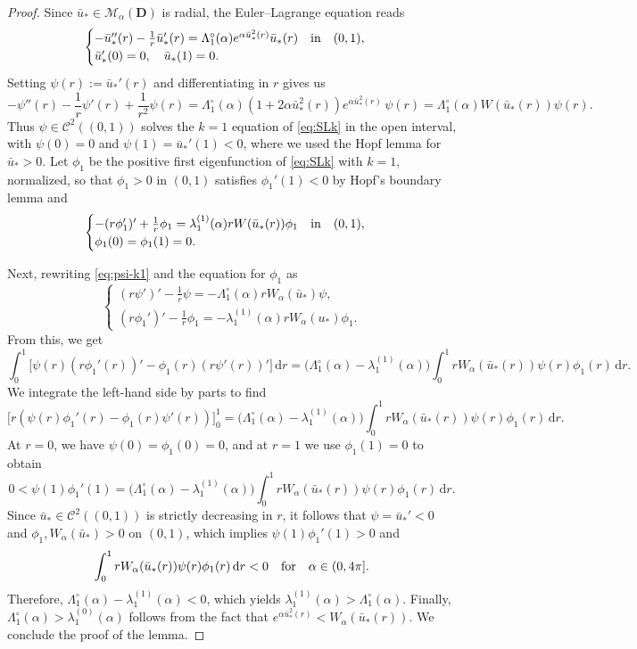 \documentclass[reqno,11pt]{amsart}
\theoremstyle{definition}
\newcommand{\ud}{\,\mathrm{d}}
\begin{document}
\begin{proof}
Since $\bar{u}_*\in\mathcal{M}_\alpha(\mathbf{D})$ is radial, the Euler--Lagrange equation reads
\[
\begin{cases}
-\bar{u}_*''(r)-\frac1r \bar{u}_*'(r)=\Lambda_1^\circ(\alpha)e^{\alpha \bar{u}_*^2(r)}\bar{u}_*(r) \quad {\rm in} \quad (0,1),\\
\bar{u}_*'(0)=0,\quad \bar{u}_*(1)=0.  
\end{cases}
\]
Setting $\psi(r):=\bar{u}_*'(r)$ and differentiating in $r$ gives us
\begin{equation}\label{eq:psi-k1}
-\psi''(r)-\frac1r\psi'(r)+\frac{1}{r^2}\psi(r)
=\Lambda_1^\circ(\alpha)(1+2\alpha \bar{u}_*^2(r))e^{\alpha \bar{u}_*^2(r)}\,\psi(r)
=\Lambda_1^\circ(\alpha)W(\bar{u}_*(r))\psi(r).
\end{equation}
Thus $\psi\in \mathcal{C}^2((0,1))$ solves the $k=1$ equation of \eqref{eq:SLk} in the open interval, with
$\psi(0)=0$ and $\psi(1)=\bar{u}_*'(1)<0$, where we used the Hopf lemma for $\bar{u}_*>0$.
Let $\phi_1$ be the positive first eigenfunction of \eqref{eq:SLk} with $k=1$,
normalized, so that $\phi_1>0$ in $(0,1)$ satisfies $\phi_1'(1)<0$ by Hopf’s boundary lemma and
\[
\begin{cases}
-(r\phi_1')'+\frac{1}{r}\phi_1=\lambda_1^{(1)}(\alpha)rW(\bar{u}_*(r))\phi_1 \quad {\rm in} \quad (0,1),\\
\phi_1(0)=\phi_1(1)=0. 
\end{cases}
\]

Next, rewriting \eqref{eq:psi-k1} and the equation for $\phi_1$ as
\[
\begin{cases}
(r\psi')'-\frac{1}{r}\psi=-\Lambda_1^\circ(\alpha)r W_\alpha(\bar{u}_*) \psi,\\
(r\phi_1')'-\frac{1}{r}\phi_1=-\lambda_1^{(1)}(\alpha)r W_\alpha(u_*)\phi_1.
\end{cases}
\]
From this, we get
\[
\int_0^1\big[\psi(r)(r\phi_1'(r))'-\phi_1(r)(r\psi'(r))'\big]\ud r
=\big(\Lambda_1^\circ(\alpha)-\lambda_1^{(1)}(\alpha)\big)\int_0^1 r W_\alpha(\bar{u}_*(r)) \psi(r)\phi_1(r)\ud r.
\]
We integrate the left-hand side by parts to find
\[
\big[r(\psi(r)\phi_1'(r)-\phi_1(r)\psi'(r))\big]_{0}^{1}
=\big(\Lambda_1^\circ(\alpha)-\lambda_1^{(1)}(\alpha)\big)\int_0^1 rW_\alpha(\bar{u}_*(r))\psi(r)\phi_1(r)\ud r.
\]
At $r=0$, we have $\psi(0)=\phi_1(0)=0$, and at $r=1$ we use $\phi_1(1)=0$ to obtain
\[
0<\psi(1)\phi_1'(1)=
\big(\Lambda_1^\circ(\alpha)-\lambda_1^{(1)}(\alpha)\big)\int_0^1 rW_\alpha(\bar{u}_*(r))\psi(r)\phi_1(r)\ud r.
\]
Since $\bar{u}_*\in \mathcal{C}^2((0,1))$ is strictly decreasing in $r$, it follows that $\psi=\bar{u}_*'<0$ and $\phi_1,W_\alpha(\bar{u}_*)>0$ on $(0,1)$, which implies $\psi(1)\phi_1'(1)>0$ and 
\[
\int_0^1 r W_\alpha(\bar{u}_*(r))\psi(r) \phi_1(r)\ud r<0 \quad {\rm for} \quad \alpha\in(0,4\pi].
\]
Therefore, $\Lambda_1^\circ(\alpha)-\lambda_1^{(1)}(\alpha)<0$, which yields
$\lambda_1^{(1)}(\alpha)>\Lambda_1^\circ(\alpha)$.
Finally, $\Lambda_1^\circ(\alpha)>\lambda_1^{(0)}(\alpha)$ follows from the 
fact that $e^{\alpha \bar{u}_*^2(r)}<W_\alpha(\bar{u}_*(r))$.
We conclude the proof of the lemma.
\end{proof}
\end{document}

